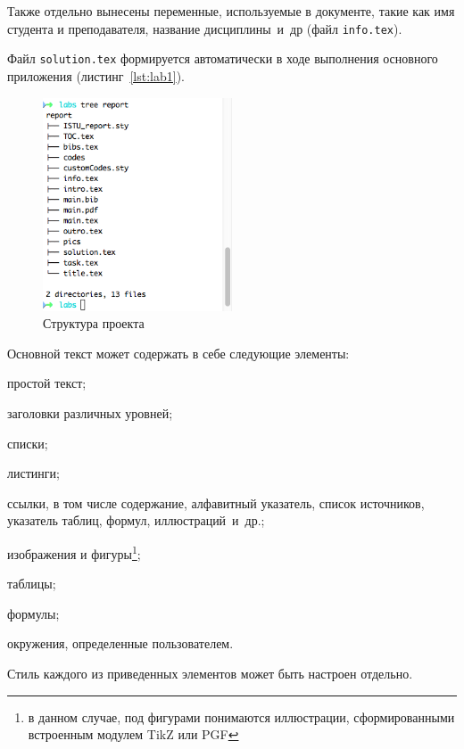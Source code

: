 Также отдельно вынесены переменные, используемые в документе, такие как имя студента и преподавателя, название дисциплины~и~др (файл \texttt{info.tex}).

Файл \texttt{solution.tex} формируется автоматически в ходе выполнения основного приложения (листинг~\ref{lst:lab1}).

\begin{figure}[H]
	\centering
	\includegraphics[width=0.5\textwidth]{pics/tree.png}
	\caption{Структура проекта}
	\label{fig:tree}
\end{figure}

Основной текст может содержать в себе следующие элементы:

\begin{itemize*}
	\item простой текст;
	\item заголовки различных уровней;
	\item списки;
	\item листинги;
	\item ссылки, в том числе содержание, алфавитный указатель, список источников, указатель таблиц, формул, иллюстраций~и~др.;
	\item изображения и фигуры\footnote{в данном случае, под фигурами понимаются иллюстрации, сформированными встроенным модулем TikZ или PGF};
	\item таблицы;
	\item формулы;
	\item окружения, определенные пользователем.
\end{itemize*}

Стиль каждого из приведенных элементов может быть настроен отдельно.